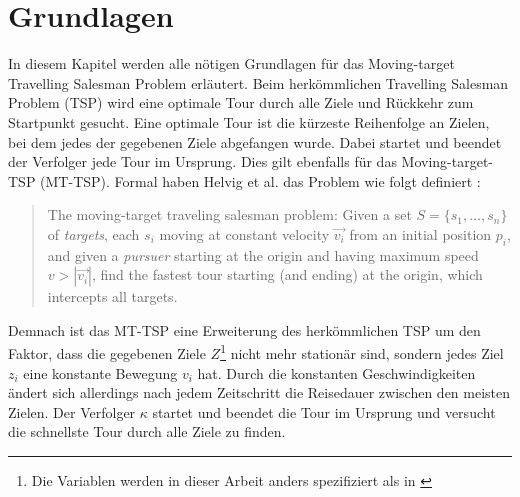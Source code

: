 \documentclass[german,version-2019-11]{uzl-thesis}
\begin{document}
\chapter{Grundlagen}
\label{kap2}
\label{chapter-use}
In diesem Kapitel werden alle nötigen Grundlagen für das Moving-target Travelling Salesman Problem erläutert. 
Beim herkömmlichen Travelling Salesman Problem (TSP) wird eine optimale Tour durch alle Ziele und Rückkehr zum Startpunkt gesucht. Eine optimale Tour ist die kürzeste Reihenfolge an Zielen, bei dem jedes der gegebenen Ziele abgefangen wurde. Dabei startet und beendet der Verfolger jede Tour im Ursprung. Dies gilt ebenfalls für das Moving-target-TSP (MT-TSP). Formal haben Helvig et al. das Problem wie folgt definiert \cite{helvig}:
\begin{quote}
The moving-target traveling salesman problem: Given a set $S = \{s_1, \dots , s_n\}$ of \emph{targets}, each $s_i$ moving at constant velocity $\overrightarrow{v_i}$ from an initial position $p_i$, and given a \emph{pursuer} starting at the origin and having maximum speed $v>|\overrightarrow{v_i}|$, find the fastest tour starting (and ending) at the origin, which intercepts all targets.
\end{quote} 
\noindent
Demnach ist das MT-TSP eine Erweiterung des herkömmlichen TSP um den Faktor, dass die gegebenen Ziele $Z$\footnote{Die Variablen werden in dieser Arbeit anders spezifiziert als in \cite{helvig}} nicht mehr stationär sind, sondern jedes Ziel $z_i$ eine konstante Bewegung $v_i$ hat. Durch die konstanten Geschwindigkeiten ändert sich allerdings nach jedem Zeitschritt die Reisedauer zwischen den meisten Zielen. Der Verfolger $\kappa$ startet und beendet die Tour im Ursprung und versucht die schnellste Tour durch alle Ziele zu finden.
\end{document}
